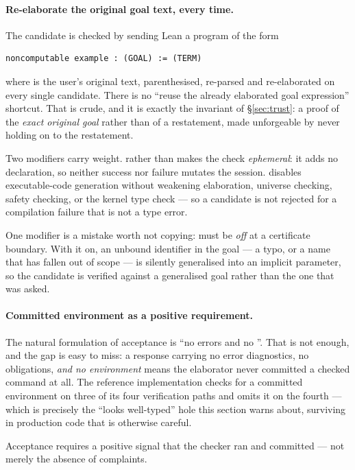 \paragraph{Re-elaborate the original goal text, every time.}
The candidate is checked by sending Lean a program of the form
\begin{lstlisting}
noncomputable example : (GOAL) := (TERM)
\end{lstlisting}
where  is the user's original text, parenthesised, re-parsed and
re-elaborated on every single candidate. There is no ``reuse the already
elaborated goal expression'' shortcut. That is crude, and it is exactly the
invariant of \S\ref{sec:trust}: a proof of the \emph{exact original goal}
rather than of a restatement, made unforgeable by never holding on to the
restatement.

Two modifiers carry weight.  rather than  makes the
check \emph{ephemeral}: it adds no declaration, so neither success nor failure
mutates the session.  disables executable-code generation
without weakening elaboration, universe checking, safety checking, or the
kernel type check --- so a candidate is not rejected for a compilation failure
that is not a type error.

One modifier is a mistake worth not copying:  must be
\emph{off} at a certificate boundary. With it on, an unbound identifier in the
goal --- a typo, or a name that has fallen out of scope --- is silently
generalised into an implicit parameter, so the candidate is verified against a
generalised goal rather than the one that was asked.

\paragraph{Committed environment as a positive requirement.}
The natural formulation of acceptance is ``no errors and no ''.
That is not enough, and the gap is easy to miss: a response carrying no error
diagnostics, no  obligations, \emph{and no environment} means the
elaborator never committed a checked command at all. The reference
implementation checks for a committed environment on three of its four
verification paths and omits it on the fourth --- which is precisely the
``looks well-typed'' hole this section warns about, surviving in production
code that is otherwise careful.

\begin{invariant}
\label{inv:positive}
Acceptance requires a positive signal that the checker ran and committed ---
not merely the absence of complaints.
\end{invariant}

